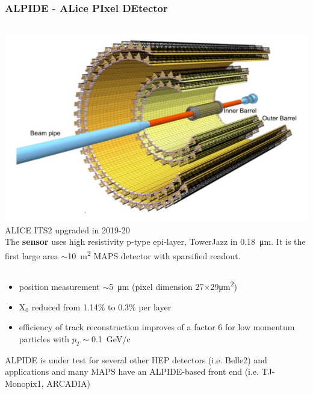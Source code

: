     \begin{frame}
        \frametitle{ALPIDE - ALice PIxel DEtector}
        \begin{columns}
                \centering
                \includegraphics[width=.99\linewidth]{figures/pixel_detectors_usage/alice.png}
            ALICE ITS2 upgraded in 2019-20\\
            \smallskip
            The \textbf{sensor} uses high resistivity p-type epi-layer, TowerJazz in \SI{0.18}{\um}. It is the first large area $\sim$\SI{10}{m\squared} MAPS detector with sparsified readout.

        \end{columns}
        \begin{itemize}
            \item position measurement $\sim$\SI{5}{\um} (pixel dimension 27$\times$29\si{\um\squared})
            \item X$_0$ reduced from 1.14\% to 0.3\% per layer
            \item efficiency of track reconstruction improves of a factor 6 for low momentum particles with $p_T \sim$\SI{0.1}{GeV/c}
        \end{itemize}
        \medskip
         
        ALPIDE is under test for several other HEP detectors (i.e. Belle2) and applications and many MAPS have an ALPIDE-based front end (i.e. TJ-Monopix1, ARCADIA)

    \end{frame} 

